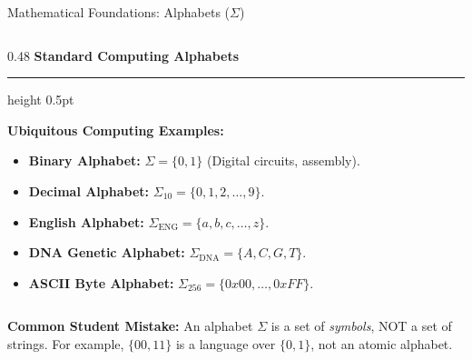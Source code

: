 \documentclass[aspectratio=169, 10pt]{beamer}
\newcommand{\colheader}[1]{%
  {\noindent\footnotesize\bfseries\color{gimpanavy}#1}%
  \vspace{0.02cm}%
  {\color{gimpanavy!30}\hrule height 0.5pt}%
  \vspace{0.05cm}%
}
\newcommand{\greentitle}[1]{{\noindent\footnotesize\bfseries\color{accentGreen}#1}\par\vspace{0.03cm}}
\begin{document}
\begin{frame}{Mathematical Foundations: Alphabets ($\Sigma$)}
\begin{columns}[T]
    \begin{column}{0.48\textwidth}
      \colheader{Standard Computing Alphabets}
      \begin{tcolorbox}[examplecard]
        \greentitle{Ubiquitous Computing Examples:}
        \begin{itemize}\setlength{\itemsep}{2.5pt}\scriptsize
          \item \textbf{Binary Alphabet:} $\Sigma = \{0, 1\}$ (Digital circuits, assembly).
          \item \textbf{Decimal Alphabet:} $\Sigma_{10} = \{0, 1, 2, \dots, 9\}$.
          \item \textbf{English Alphabet:} $\Sigma_{\text{ENG}} = \{a, b, c, \dots, z\}$.
          \item \textbf{DNA Genetic Alphabet:} $\Sigma_{\text{DNA}} = \{A, C, G, T\}$.
          \item \textbf{ASCII Byte Alphabet:} $\Sigma_{256} = \{0x00, \dots, 0xFF\}$.
        \end{itemize}
      \end{tcolorbox}
    \end{column}
  \end{columns}
  
  \vspace{0.10cm}
  \begin{tcolorbox}[alertcard]
    {\scriptsize\textbf{Common Student Mistake:} An alphabet $\Sigma$ is a set of \textit{symbols}, NOT a set of strings. For example, $\{00, 11\}$ is a language over $\{0,1\}$, not an atomic alphabet.}
  \end{tcolorbox}
\end{frame}
\end{document}
